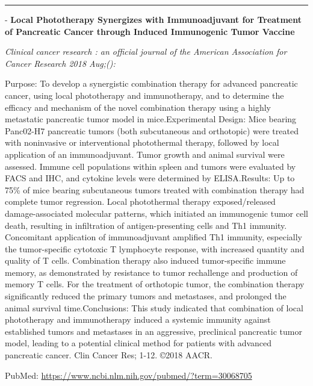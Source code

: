 \documentclass[]{article}
\begin{document}
{}

{}

\begin{center}\rule{0.5\linewidth}{\linethickness}\end{center}

 - \textbf{Local Phototherapy Synergizes with Immunoadjuvant for
Treatment of Pancreatic Cancer through Induced Immunogenic Tumor
Vaccine}

\emph{Clinical cancer research : an official journal of the American
Association for Cancer Research 2018 Aug;():}

Purpose: To develop a synergistic combination therapy for advanced
pancreatic cancer, using local phototherapy and immunotherapy, and to
determine the efficacy and mechanism of the novel combination therapy
using a highly metastatic pancreatic tumor model in mice.Experimental
Design: Mice bearing Panc02-H7 pancreatic tumors (both subcutaneous and
orthotopic) were treated with noninvasive or interventional photothermal
therapy, followed by local application of an immunoadjuvant. Tumor
growth and animal survival were assessed. Immune cell populations within
spleen and tumors were evaluated by FACS and IHC, and cytokine levels
were determined by ELISA.Results: Up to 75\% of mice bearing
subcutaneous tumors treated with combination therapy had complete tumor
regression. Local photothermal therapy exposed/released
damage-associated molecular patterns, which initiated an immunogenic
tumor cell death, resulting in infiltration of antigen-presenting cells
and Th1 immunity. Concomitant application of immunoadjuvant amplified
Th1 immunity, especially the tumor-specific cytotoxic T lymphocyte
response, with increased quantity and quality of T cells. Combination
therapy also induced tumor-specific immune memory, as demonstrated by
resistance to tumor rechallenge and production of memory T cells. For
the treatment of orthotopic tumor, the combination therapy significantly
reduced the primary tumors and metastases, and prolonged the animal
survival time.Conclusions: This study indicated that combination of
local phototherapy and immunotherapy induced a systemic immunity against
established tumors and metastases in an aggressive, preclinical
pancreatic tumor model, leading to a potential clinical method for
patients with advanced pancreatic cancer. Clin Cancer Res; 1-12. ©2018
AACR.

PubMed: \url{https://www.ncbi.nlm.nih.gov/pubmed/?term=30068705}

{}

{}
\end{document}
